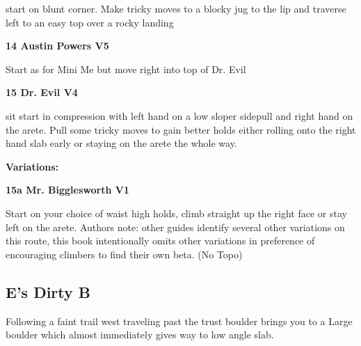 \begin{multicols}{2}
			\begin{adjustwidth}{0.5cm}{}				
			start on blunt corner. Make tricky moves to a blocky jug to the lip and traverse left to an easy top over a rocky landing
			\end{adjustwidth}
			\label{rt:Austin Powers}
\colorbox{RoyalBlue!20}{
\parbox{0.95\linewidth}{
\textbf{
14 Austin Powers V5  
}
}
}

			\begin{adjustwidth}{0.5cm}{}				
			Start as for Mini Me but move right into top of Dr. Evil
			\end{adjustwidth}

			\label{rt:Dr. Evil}
\colorbox{RoyalBlue!20}{
\parbox{0.95\linewidth}{
\textbf{
15 Dr. Evil V4  
}
}
}

			\begin{adjustwidth}{0.5cm}{}				
			sit start in compression with left hand on a low sloper sidepull and right hand on the arete. Pull some tricky moves to gain better holds either rolling onto the right hand slab early or staying on the arete the whole way.
			\end{adjustwidth}
				\begin{adjustwidth}{0.5cm}{}				
				\textbf{Variations:} \newline
					\label{vr:Mr. Bigglesworth}
\colorbox{green!20}{
\parbox{0.95\linewidth}{
\textbf{
15a Mr. Bigglesworth V1  
}
}
}

					\begin{adjustwidth}{0.5cm}{}				
					Start on your choice of waist high holds, climb straight up the right face or stay left on the arete. Authors note: other guides identify several other variations on this route, this book intentionally omits other variations in preference of encouraging climbers to find their own beta.
						\newline (No Topo) 
					\end{adjustwidth}
				\end{adjustwidth}
		\subsection*{E's Dirty B}\label{bf:E's Dirty B}
		Following a faint trail west traveling past the trust boulder brings you to a Large boulder which almost immediately gives way to low angle slab.\\
	


\end{multicols}
